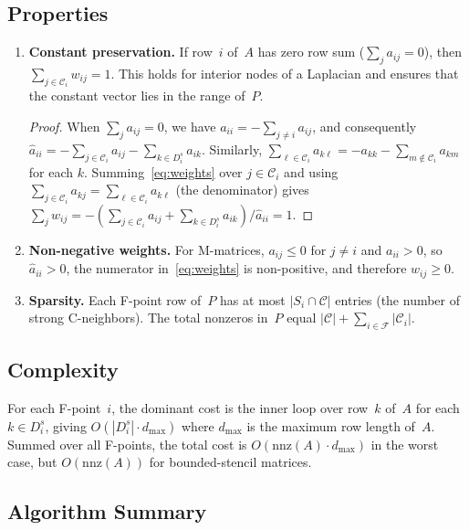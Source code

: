 \documentclass[11pt]{article}
\newcommand{\CC}{\mathcal{C}}
\newcommand{\FF}{\mathcal{F}}
\begin{document}
\subsection{Properties}

\begin{enumerate}
  \item \textbf{Constant preservation.}  If row~$i$ of~$A$ has zero row
    sum ($\sum_j a_{ij} = 0$), then $\sum_{j \in \CC_i} w_{ij} = 1$.
    This holds for interior nodes of a Laplacian and ensures that the
    constant vector lies in the range of~$P$.

    \begin{proof}
      When $\sum_j a_{ij} = 0$, we have
      $a_{ii} = -\sum_{j \ne i} a_{ij}$, and consequently
      $\hat{a}_{ii} = -\sum_{j \in \CC_i} a_{ij} - \sum_{k \in D_i^s} a_{ik}$.
      Similarly, $\sum_{\ell \in \CC_i} a_{k\ell} = -a_{kk} - \sum_{m \notin \CC_i} a_{km}$
      for each $k$.  Summing~\eqref{eq:weights} over $j \in \CC_i$ and
      using $\sum_{j \in \CC_i} a_{kj} = \sum_{\ell \in \CC_i} a_{k\ell}$
      (the denominator) gives
      $\sum_j w_{ij} = -(\sum_{j \in \CC_i} a_{ij} + \sum_{k \in D_i^s} a_{ik}) / \hat{a}_{ii} = 1$.
    \end{proof}

  \item \textbf{Non-negative weights.}  For M-matrices, $a_{ij} \le 0$
    for $j \ne i$ and $a_{ii} > 0$, so $\hat{a}_{ii} > 0$, the
    numerator in~\eqref{eq:weights} is non-positive, and therefore
    $w_{ij} \ge 0$.

  \item \textbf{Sparsity.}  Each F-point row of~$P$ has at most
    $|S_i \cap \CC|$ entries (the number of strong C-neighbors).
    The total nonzeros in~$P$ equal $|\CC| + \sum_{i \in \FF} |\CC_i|$.
\end{enumerate}

\subsection{Complexity}

For each F-point~$i$, the dominant cost is the inner loop over row~$k$
of~$A$ for each $k \in D_i^s$, giving $O(|D_i^s| \cdot d_{\max})$
where $d_{\max}$ is the maximum row length of~$A$.  Summed over all
F-points, the total cost is $O(\mathrm{nnz}(A) \cdot d_{\max})$ in the
worst case, but $O(\mathrm{nnz}(A))$ for bounded-stencil matrices.

\subsection{Algorithm Summary}
\end{document}
